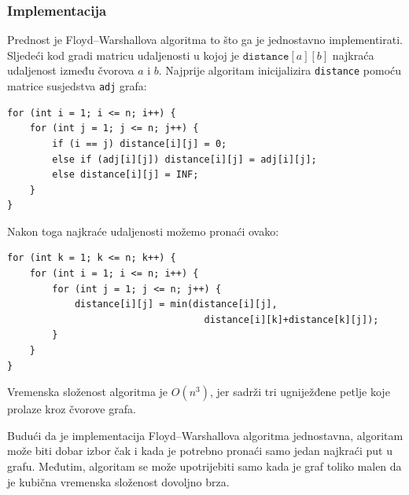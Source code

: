 \subsubsection{Implementacija}

Prednost je
Floyd–Warshallova algoritma to što ga je
jednostavno implementirati.
Sljedeći kod gradi
matricu udaljenosti u kojoj je $\texttt{distance}[a][b]$
najkraća udaljenost između čvorova $a$ i $b$.
Najprije algoritam inicijalizira \texttt{distance}
pomoću matrice susjedstva \texttt{adj} grafa:

\begin{lstlisting}
for (int i = 1; i <= n; i++) {
    for (int j = 1; j <= n; j++) {
        if (i == j) distance[i][j] = 0;
        else if (adj[i][j]) distance[i][j] = adj[i][j];
        else distance[i][j] = INF;
    }
}
\end{lstlisting}
Nakon toga najkraće udaljenosti možemo pronaći ovako:
\begin{lstlisting}
for (int k = 1; k <= n; k++) {
    for (int i = 1; i <= n; i++) {
        for (int j = 1; j <= n; j++) {
            distance[i][j] = min(distance[i][j],
                                   distance[i][k]+distance[k][j]);
        }
    }
}
\end{lstlisting}

Vremenska složenost algoritma je $O(n^3)$,
jer sadrži tri ugniježđene petlje
koje prolaze kroz čvorove grafa.

Budući da je implementacija Floyd–Warshallova
algoritma jednostavna, algoritam može biti
dobar izbor čak i kada je potrebno pronaći samo
jedan najkraći put u grafu.
Međutim, algoritam se može upotrijebiti samo kada je graf
toliko malen da je kubična vremenska složenost dovoljno brza.
